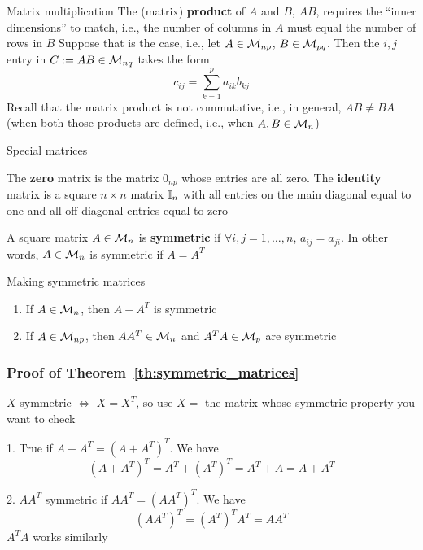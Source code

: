 \documentclass[aspectratio=169]{beamer}\usepackage[]{graphicx}\usepackage[]{xcolor}
\begin{document}
\begin{frame}{Matrix multiplication}
The (matrix) \textbf{product} of $A$ and $B$, $AB$, requires the ``inner dimensions'' to match, i.e., the number of columns in $A$ must equal the number of rows in $B$
\vfill
Suppose that is the case, i.e., let $A\in\mathcal{M}_{np}$, $B\in\mathcal{M}_{pq}$. Then the $i,j$ entry in $C:=AB\in\mathcal{M}_{nq}$ takes the form
\[
c_{ij} = \sum_{k=1}^p a_{ik}b_{kj}
\]
\vfill
Recall that the matrix product is not commutative, i.e., in general, $AB\neq BA$ (when both those products are defined, i.e., when $A,B\in\mathcal{M}_n$)
\end{frame}

\begin{frame}{Special matrices}
\begin{importantdefinition}
The \textbf{zero} matrix is the matrix $0_{np}$ whose entries are all zero.
The \textbf{identity} matrix is a square $n\times n$ matrix $\mathbb{I}_n$ with all entries on the main diagonal equal to one and all off diagonal entries equal to zero
\end{importantdefinition}
\vfill
\begin{importantdefinition}
A square matrix $A\in\mathcal{M}_n$ is \textbf{symmetric} if $\forall i,j=1,\ldots,n$, $a_{ij}=a_{ji}$. In other words, $A\in\mathcal{M}_n$ is symmetric if $A=A^T$
\end{importantdefinition}
\end{frame}


\begin{frame}{Making symmetric matrices}
\begin{importanttheorem}\label{th:symmetric_matrices}
\begin{enumerate}
	\item If $A\in\mathcal{M}_n$, then $A+A^T$ is symmetric
	\item If $A\in\mathcal{M}_{np}$, then $AA^T\in\mathcal{M}_n$ and $A^TA\in\mathcal{M}_p$ are symmetric
\end{enumerate}
\end{importanttheorem}
\end{frame}

\begin{frame}[importantcolour]
\frametitle{Proof of Theorem~\ref{th:symmetric_matrices}}
$X$ symmetric $\iff$ $X=X^T$, so use $X=$ the matrix whose symmetric property you want to check

1. True if $A+A^T=(A+A^T)^T$. We have 
\[
(A+A^T)^T=A^T+(A^T)^T=A^T+A=A+A^T
\]

2. $AA^T$ symmetric if $AA^T=(AA^T)^T$. We have 
\[
(AA^T)^T=(A^T)^TA^T=AA^T
\]
$A^TA$ works similarly
\end{frame}
\end{document}
